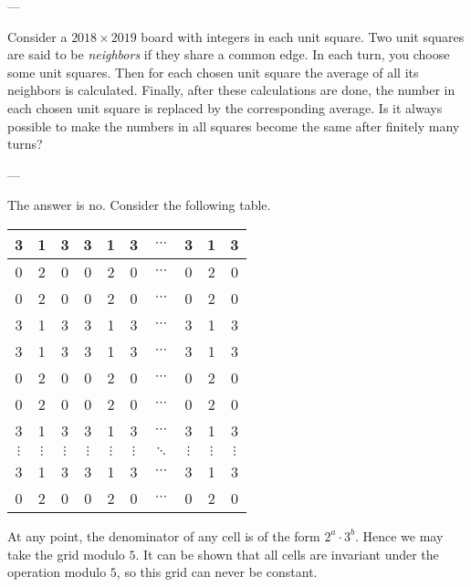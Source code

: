 
---

Consider a $2018\times2019$ board with integers in each unit square. Two unit squares are said to be \emph{neighbors} if they share a common edge. In each turn, you choose some unit squares. Then for each chosen unit square the average of all its neighbors is calculated. Finally, after these calculations are done, the number in each chosen unit square is replaced by the corresponding average. Is it always possible to make the numbers in all squares become the same after finitely many turns?

---

The answer is no. Consider the following table.
\begin{center}
    \begin{tabular}{||c|c|c||c|c|c||c||c|c|c||}
        \hline\hline
        3 & 1 & 3 & 3 & 1 & 3 & $\cdots$ & 3 & 1 & 3\\ \hline
        0 & 2 & 0 & 0 & 2 & 0 & $\cdots$ & 0 & 2 & 0\\ \hline\hline
        0 & 2 & 0 & 0 & 2 & 0 & $\cdots$ & 0 & 2 & 0\\ \hline
        3 & 1 & 3 & 3 & 1 & 3 & $\cdots$ & 3 & 1 & 3\\ \hline\hline
        3 & 1 & 3 & 3 & 1 & 3 & $\cdots$ & 3 & 1 & 3\\ \hline
        0 & 2 & 0 & 0 & 2 & 0 & $\cdots$ & 0 & 2 & 0\\ \hline\hline
        0 & 2 & 0 & 0 & 2 & 0 & $\cdots$ & 0 & 2 & 0\\ \hline
        3 & 1 & 3 & 3 & 1 & 3 & $\cdots$ & 3 & 1 & 3\\ \hline\hline
        $\vdots$ & $\vdots$ & $\vdots$ & $\vdots$ & $\vdots$ & $\vdots$ & $\ddots$ & $\vdots$ & $\vdots$ & $\vdots$ \\ \hline
        3 & 1 & 3 & 3 & 1 & 3 & $\cdots$ & 3 & 1 & 3\\ \hline
        0 & 2 & 0 & 0 & 2 & 0 & $\cdots$ & 0 & 2 & 0\\ \hline\hline
    \end{tabular}
\end{center}
At any point, the denominator of any cell is of the form $2^a\cdot3^b$. Hence we may take the grid modulo $5$. It can be shown that all cells are invariant under the operation modulo $5$, so this grid can never be constant.

